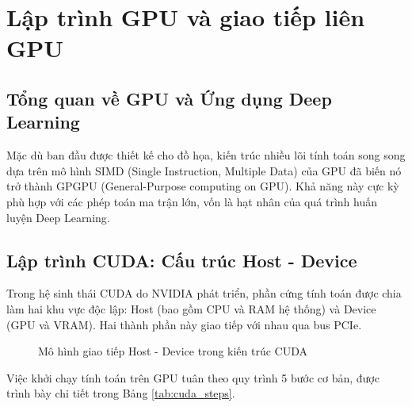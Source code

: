 \section{Lập trình GPU và giao tiếp liên GPU}

\subsection{Tổng quan về GPU và Ứng dụng Deep Learning}
Mặc dù ban đầu được thiết kế cho đồ họa, kiến trúc nhiều lõi tính toán song song dựa trên mô hình SIMD (Single Instruction, Multiple Data) của GPU đã biến nó trở thành GPGPU (General-Purpose computing on GPU). Khả năng này cực kỳ phù hợp với các phép toán ma trận lớn, vốn là hạt nhân của quá trình huấn luyện Deep Learning.

\subsection{Lập trình CUDA: Cấu trúc Host - Device}
Trong hệ sinh thái CUDA do NVIDIA phát triển, phần cứng tính toán được chia làm hai khu vực độc lập: Host (bao gồm CPU và RAM hệ thống) và Device (GPU và VRAM). Hai thành phần này giao tiếp với nhau qua bus PCIe.

\begin{figure}[H]
    \centering
    \caption{Mô hình giao tiếp Host - Device trong kiến trúc CUDA}
    \label{fig:host_device}
\end{figure}

Việc khởi chạy tính toán trên GPU tuân theo quy trình 5 bước cơ bản, được trình bày chi tiết trong Bảng \ref{tab:cuda_steps}.

